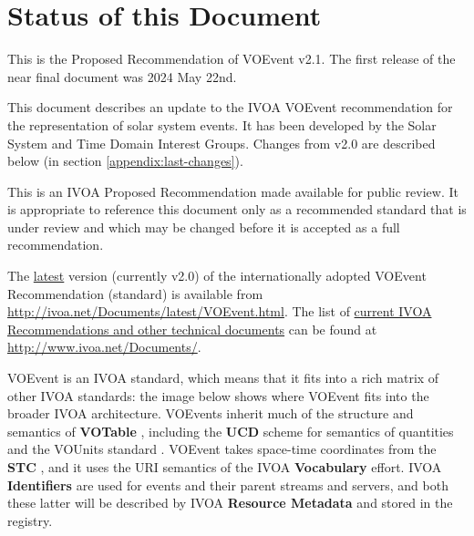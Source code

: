 \documentclass[11pt,a4paper]{ivoa}
\begin{document}
\section*{Status of this Document}
This is the Proposed Recommendation of VOEvent v2.1. The first release of the
near final document was 2024 May 22nd.

This document describes an update to the IVOA VOEvent recommendation for the
representation of solar system events. It has been developed by the Solar System
and Time Domain Interest Groups. Changes from v2.0 are described below (in
section \ref{appendix:last-changes}). 

This is an IVOA Proposed Recommendation made available for public review. It is
appropriate to reference this document only as a recommended standard that is
under review and which may be changed before it is accepted as a full
recommendation.

The \href{http://ivoa.net/Documents/latest/VOEvent.html}{latest} version
(currently v2.0) of the internationally adopted VOEvent Recommendation
(standard) is available from \url{http://ivoa.net/Documents/latest/VOEvent.html}.
The list of \href{http://www.ivoa.net/Documents/}{current IVOA Recommendations
and other technical documents} can be found at \url{http://www.ivoa.net/Documents/}.

VOEvent is an IVOA standard, which means that it fits into a rich matrix of
other IVOA standards: the image below shows where VOEvent fits into the broader
IVOA architecture. VOEvents inherit much of the structure and semantics of {\bf
VOTable} \citep{2019ivoa.spec.1021O}, including the {\bf UCD} 
\citep{2018ivoa.spec.0527P} scheme for semantics of quantities and the VOUnits
standard \citep{2014ivoa.spec.0523D}. VOEvent takes space-time coordinates from
the {\bf STC} \citep{2007ivoa.spec.1030R}, and it uses the URI semantics of the
IVOA {\bf Vocabulary} \citep{2009ivoa.spec.1007G} effort. IVOA {\bf Identifiers}
\citep{2016ivoa.spec.0523D} are used for events and their parent streams and
servers, and both these latter will be described by IVOA {\bf Resource Metadata}
\citep{2007ivoa.spec.0302H} and stored in the registry. 
\end{document}
